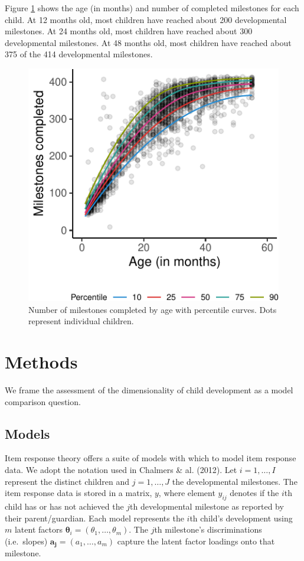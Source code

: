 \documentclass[10pt, letterpaper]{article}
\newenvironment{CodeChunk}{}{}
\begin{document}
Figure \ref{fig:growth} shows the age (in months) and number of
completed milestones for each child. At 12 months old, most children
have reached about 200 developmental milestones. At 24 months old, most
children have reached about 300 developmental milestones. At 48 months
old, most children have reached about 375 of the 414 developmental
milestones.

\begin{CodeChunk}
\begin{figure}[tb]
\includegraphics{figs/growth-1} \caption[Number of milestones completed by age with percentile curves]{Number of milestones completed by age with percentile curves. Dots represent individual children.}\label{fig:growth}
\end{figure}
\end{CodeChunk}

\hypertarget{methods}{%
\section{Methods}\label{methods}}

We frame the assessment of the dimensionality of child development as a
model comparison question.

\hypertarget{models}{%
\subsection{Models}\label{models}}

Item response theory offers a suite of models with which to model item
response data. We adopt the notation used in Chalmers \& al. (2012). Let
\(i = 1, \ldots, I\) represent the distinct children and
\(j = 1, \ldots, J\) the developmental milestones. The item response
data is stored in a matrix, \(y\), where element \(y_{ij}\) denotes if
the \(i\)th child has or has not achieved the \(j\)th developmental
milestone as reported by their parent/guardian. Each model represents
the \(i\)th child's development using \(m\) latent factors
\(\boldsymbol{\theta}_{i}=(\theta_1, \dots, \theta_m)\). The \(j\)th
milestone's discriminations (i.e.~slopes)
\(\boldsymbol{a_j}=(a_1, \dots, a_m)\) capture the latent factor
loadings onto that milestone.
\end{document}
